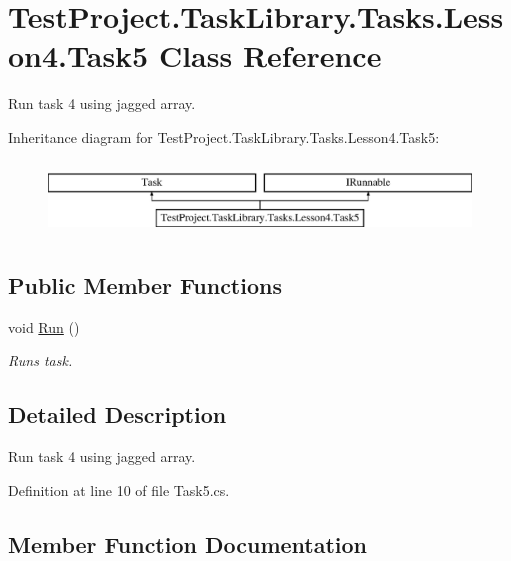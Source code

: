 \hypertarget{class_test_project_1_1_task_library_1_1_tasks_1_1_lesson4_1_1_task5}{}\section{Test\+Project.\+Task\+Library.\+Tasks.\+Lesson4.\+Task5 Class Reference}
\label{class_test_project_1_1_task_library_1_1_tasks_1_1_lesson4_1_1_task5}


Run task 4 using jagged array.  


Inheritance diagram for Test\+Project.\+Task\+Library.\+Tasks.\+Lesson4.\+Task5\+:\begin{figure}[H]
\begin{center}
\leavevmode
\includegraphics[height=2.000000cm]{class_test_project_1_1_task_library_1_1_tasks_1_1_lesson4_1_1_task5}
\end{center}
\end{figure}
\subsection*{Public Member Functions}
\begin{DoxyCompactItemize}
\item 
void \mbox{\hyperlink{class_test_project_1_1_task_library_1_1_tasks_1_1_lesson4_1_1_task5_a2615e373a11ae2c786fcfcd7cfedf3b4}{Run}} ()
\begin{DoxyCompactList}\small\item\em Runs task. \end{DoxyCompactList}\end{DoxyCompactItemize}


\subsection{Detailed Description}
Run task 4 using jagged array. 



Definition at line 10 of file Task5.\+cs.



\subsection{Member Function Documentation}
\mbox{\label{class_test_project_1_1_task_library_1_1_tasks_1_1_lesson4_1_1_task5_a2615e373a11ae2c786fcfcd7cfedf3b4}} 
